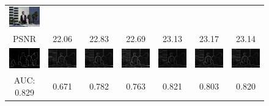 \documentclass[10pt,twocolumn,letterpaper]{article}
\begin{document}
\begin{figure} [tb]
\begin{tabular*}{0.5\textwidth}{ccccccc}
  \includegraphics[width=2cm]{fig/119082[7-JOR]_g.jpg} \\
  PSNR & 22.06 & 22.83 & 22.69 & 23.13 & 23.17 & 23.14 \\     
  \hspace{-2mm}
  \includegraphics[width=2cm]{fig/119082_seg.jpg} & \hspace{-4mm}
  \includegraphics[width=2cm]{fig/119082[2-Bicubic]_crisp.jpg} & \hspace{-4mm}
  \includegraphics[width=2cm]{fig/119082[3-Zeyde]_crisp.jpg} & \hspace{-4mm}
  \includegraphics[width=2cm]{fig/119082[4-ANR]_crisp.jpg} & \hspace{-4mm}
  \includegraphics[width=2cm]{fig/119082[5-SRCNN]_crisp.jpg} & \hspace{-4mm}
  \includegraphics[width=2cm]{fig/119082[6-A+]_crisp.jpg} & \hspace{-4mm}
  \includegraphics[width=2cm]{fig/119082[7-JOR]_crisp.jpg} \\
  AUC: 0.829 & 0.671 & 0.782 & 0.763 & 0.821 & 0.803 & 0.820 \\ 

\end{tabular*}
\end{figure}
\end{document}
